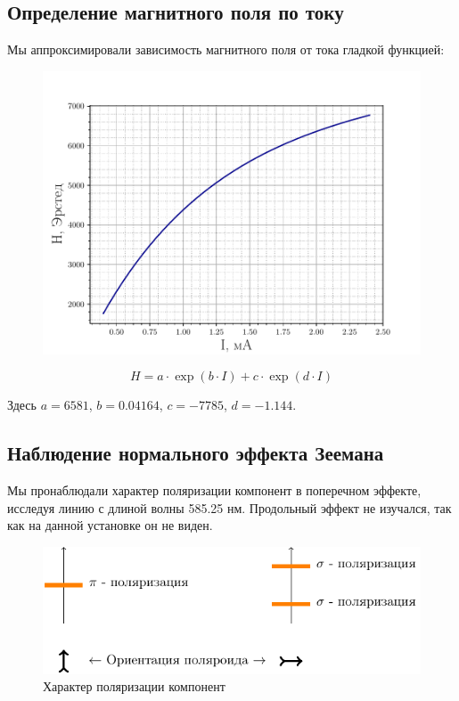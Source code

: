 \newpage
\subsection{Определение магнитного поля по току}

Мы аппроксимировали зависимость магнитного поля от тока гладкой функцией:
\begin{figure}[H]
	\centering
	\includegraphics[]{fig/kurwa}
	\label{fig:figure1}
\end{figure}

\begin{equation}
	H=a\cdot\exp\left(b\cdot I\right)+c\cdot \exp\left(d\cdot I\right) 
\end{equation}

Здесь 	$a= 6581$, $b=0.04164$, $c= -7785$, $d= -1.144$. 

\subsection{Наблюдение нормального эффекта Зеемана}

Мы пронаблюдали характер поляризации компонент в поперечном эффекте, исследуя линию с  длиной волны  585.25 нм. Продольный эффект не изучался, так как на данной установке он не виден.

\begin{figure}[H]
	\centering
	\includegraphics[scale=1]{ris/2a}
	\caption{Характер поляризации компонент}
	\label{fig:ris2a}
\end{figure}

